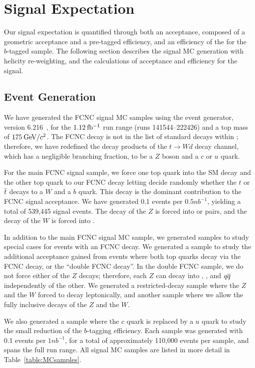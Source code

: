\section{Signal Expectation}
Our signal expectation is quantified through both an acceptance, composed
of a geometric acceptance and a pre-tagged efficiency, and an 
efficiency of the \btag for the $b$-tagged sample. The following
section describes the signal MC generation with helicity re-weighting,
and the calculations of acceptance and efficiency for the signal.

\subsection{Event Generation}
We have generated the FCNC signal MC samples using the \pyth event
generator, version 6.216~\cite{Sjostrand:2003wg}, for the $1.12\:\mathrm{fb^{-1}}$
run range (runs 141544--222426) and a top mass of $175\:\mathrm{GeV}/c^{2}$. The
FCNC decay \tZq is not in the list of standard decays within
\pyth; therefore, we have redefined the decay products of the $t
\rightarrow W d$ decay channel, which has a negligible branching fraction, 
to be a $Z$ boson and a $c$ or $u$ quark. 

For the main FCNC signal sample, we force one top quark into the SM
decay \tWb and the other top quark to our FCNC decay \tZc
letting \pyth decide randomly whether the
$t$ or $\overline{t}$ decays to a $W$ and a $b$ quark.  This decay is the
dominant contribution to the FCNC signal acceptance.  We have
generated 0.1 events per $0.5\unit{nb^{-1}}$, yielding a total of
539,445 signal events. The decay of the $Z$ is forced into \ee or
\mm pairs, and the decay of the $W$ is forced into \Wqq.

In addition to the main FCNC signal MC sample, we generated samples 
to study special cases for events with an FCNC decay. We generated a sample
to study the additional acceptance gained from events where both top quarks 
decay via the FCNC decay, or the ``double FCNC decay''. In the double FCNC sample, 
we do not force either of the $Z$ decays; therefore, each $Z$ can decay into \ee, 
\mm, and $q\overline{q}$ independently of the other. We generated a restricted-decay sample
where the $Z$ and the $W$ forced to decay leptonically, and another sample where we 
allow the fully inclusive decays of the $Z$ and the $W$.


We also generated a sample where the $c$ quark is replaced by a $u$ quark to 
study the small reduction of the $b$-tagging efficiency. Each sample was generated 
with 0.1 events per $1\unit{nb^{-1}}$, for a total of approximately 110,000 events 
per sample, and spans the full run range. All signal MC samples are listed in more detail in 
Table~\ref{table:MCsamples}.

